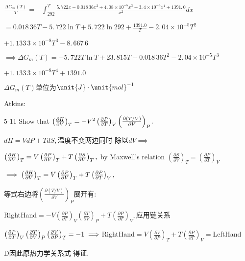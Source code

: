\documentclass{ctexart}
\begin{document}
$\frac{\Delta G_{m}\left( T\right) }{T}=-\int_{292}^{T}\frac{5.\,\allowbreak
722x-0.018\,36x^{2}+4.\,\allowbreak 08\times 10^{-5}x^{3}-3.\,\allowbreak
4\times 10^{-8}\allowbreak x^{4}+1391.\,\allowbreak 0}{x^{2}}dx$

$=\allowbreak 0.018\,36T-5.\,\allowbreak 722\ln T+5.\,\allowbreak 722\ln
292+\allowbreak \frac{1391.0}{T}-2.\,\allowbreak 04\times 10^{-5}T^{2}$

$+1.\,\allowbreak 133\,3\times 10^{-8}\allowbreak T^{3}-8.\,\allowbreak
667\,6$

$\implies \Delta G_{m}\left( T\right) =-5.\,\allowbreak 722\allowbreak T\ln
T+\allowbreak 23.\,\allowbreak 815T+0.018\,36T^{2}-2.\,\allowbreak 04\times
10^{-5}T^{3}$

$+1.\,\allowbreak 133\,3\times 10^{-8}T^{4}+\allowbreak 1391.0$

$\Delta G_{m}\left( T\right) $单位为$\unit{J}\cdot \unit{%
mol}^{-1}$

Atkins:

5-11 Show that $\left( \frac{\partial H}{\partial V}\right)
_{T}=-V^{2}\left( \frac{\partial P}{\partial T}\right) _{V}\left( \frac{%
\partial \left( T/V\right) }{\partial V}\right) _{P}.$

$dH=VdP+TdS,$温度不变两边同时%
除以$dV\implies $

$\left( \frac{\partial H}{\partial V}\right) _{T}=V\left( \frac{\partial P}{%
\partial V}\right) _{T}+T\left( \frac{\partial S}{\partial V}\right) _{T},$%
by Maxwell's relation $\left( \frac{\partial S}{\partial V}\right)
_{T}=\left( \frac{\partial P}{\partial T}\right) _{V}$

$\implies \left( \frac{\partial H}{\partial V}\right) _{T}=V\left( \frac{%
\partial P}{\partial V}\right) _{T}+T\left( \frac{\partial P}{\partial T}%
\right) _{V},$

等式右边将$\left( \frac{\partial \left(
T/V\right) }{\partial V}\right) _{P}$展开有:

\bigskip RightHand$=-V\left( \frac{\partial P}{\partial T}\right) _{V}\left( 
\frac{\partial T}{\partial V}\right) _{P}+T\left( \frac{\partial P}{\partial
T}\right) _{V},$应用链关系

$\left( \frac{\partial P}{\partial T}\right) _{V}\left( \frac{\partial T}{%
\partial V}\right) _{P}\left( \frac{\partial V}{\partial P}\right)
_{T}=-1\implies $RightHand$=V\left( \frac{\partial V}{\partial P}\right)
_{T}+T\left( \frac{\partial P}{\partial T}\right) _{V}=$LeftHand

D因此原热力学关系式%
得证.
\end{document}
